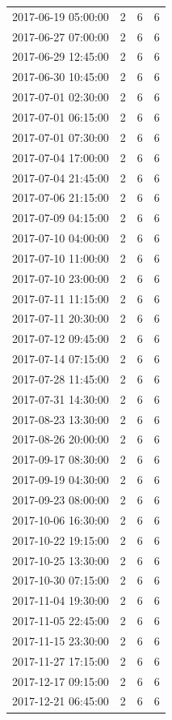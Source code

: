 \begin{tabular}{lrrr}
2017-06-19 05:00:00 & 2 & 6 & 6 \\
2017-06-27 07:00:00 & 2 & 6 & 6 \\
2017-06-29 12:45:00 & 2 & 6 & 6 \\
2017-06-30 10:45:00 & 2 & 6 & 6 \\
2017-07-01 02:30:00 & 2 & 6 & 6 \\
2017-07-01 06:15:00 & 2 & 6 & 6 \\
2017-07-01 07:30:00 & 2 & 6 & 6 \\
2017-07-04 17:00:00 & 2 & 6 & 6 \\
2017-07-04 21:45:00 & 2 & 6 & 6 \\
2017-07-06 21:15:00 & 2 & 6 & 6 \\
2017-07-09 04:15:00 & 2 & 6 & 6 \\
2017-07-10 04:00:00 & 2 & 6 & 6 \\
2017-07-10 11:00:00 & 2 & 6 & 6 \\
2017-07-10 23:00:00 & 2 & 6 & 6 \\
2017-07-11 11:15:00 & 2 & 6 & 6 \\
2017-07-11 20:30:00 & 2 & 6 & 6 \\
2017-07-12 09:45:00 & 2 & 6 & 6 \\
2017-07-14 07:15:00 & 2 & 6 & 6 \\
2017-07-28 11:45:00 & 2 & 6 & 6 \\
2017-07-31 14:30:00 & 2 & 6 & 6 \\
2017-08-23 13:30:00 & 2 & 6 & 6 \\
2017-08-26 20:00:00 & 2 & 6 & 6 \\
2017-09-17 08:30:00 & 2 & 6 & 6 \\
2017-09-19 04:30:00 & 2 & 6 & 6 \\
2017-09-23 08:00:00 & 2 & 6 & 6 \\
2017-10-06 16:30:00 & 2 & 6 & 6 \\
2017-10-22 19:15:00 & 2 & 6 & 6 \\
2017-10-25 13:30:00 & 2 & 6 & 6 \\
2017-10-30 07:15:00 & 2 & 6 & 6 \\
2017-11-04 19:30:00 & 2 & 6 & 6 \\
2017-11-05 22:45:00 & 2 & 6 & 6 \\
2017-11-15 23:30:00 & 2 & 6 & 6 \\
2017-11-27 17:15:00 & 2 & 6 & 6 \\
2017-12-17 09:15:00 & 2 & 6 & 6 \\
2017-12-21 06:45:00 & 2 & 6 & 6 \\

\end{tabular}
